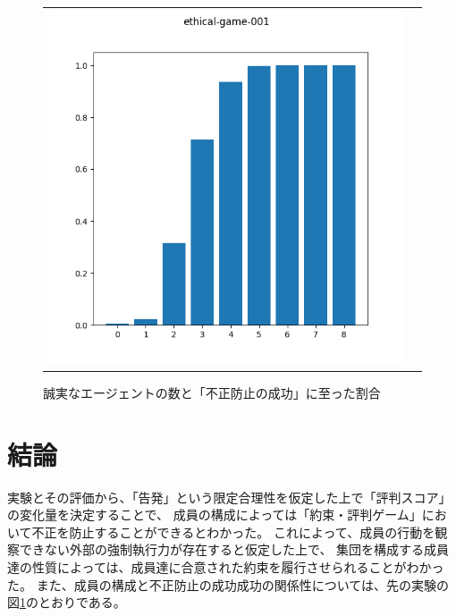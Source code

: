 \begin{figure}[h]
  \begin{tabular}{cc}
    \begin{minipage}[t]{1\hsize}
      \centering
      \includegraphics[keepaspectratio, width=1\linewidth]{./06_ethical-prgame/ethical-game-001.png}
      \caption{誠実なエージェントの数と「不正防止の成功」に至った割合}
      \label{ethical-game-001}
    \end{minipage}
  \end{tabular}
\end{figure}

\section{結論}
実験とその評価から、「告発」という限定合理性を仮定した上で「評判スコア」の変化量を決定することで、
成員の構成によっては「約束・評判ゲーム」において不正を防止することができるとわかった。
これによって、成員の行動を観察できない外部の強制執行力が存在すると仮定した上で、
集団を構成する成員達の性質によっては、成員達に合意された約束を履行させられることがわかった。
また、成員の構成と不正防止の成功成功の関係性については、先の実験の図\ref{ethical-game-001}のとおりである。
